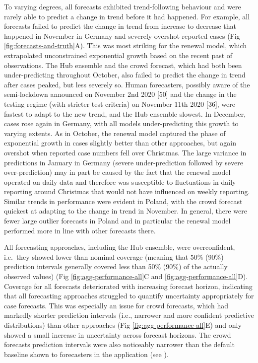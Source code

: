 \documentclass[10pt,letterpaper]{article}
\begin{document}
To varying degrees, all forecasts exhibited trend-following behaviour
and were rarely able to predict a change in trend before it had
happened. For example, all forecasts failed to predict the change in
trend from increase to decrease that happened in November in Germany and
severely overshot reported cases (Fig \ref{fig:forecasts-and-truth}A).
This was most striking for the renewal model, which extrapolated
unconstrained exponential growth based on the recent past of
observations. The Hub ensemble and the crowd forecast, which had both
been under-predicting throughout October, also failed to predict the
change in trend after cases peaked, but less severely so. Human
forecasters, possibly aware of the semi-lockdown announced on November
2nd 2020 {[}50{]} and the change in the testing regime (with stricter
test criteria) on November 11th 2020 {[}36{]}, were fastest to adapt to
the new trend, and the Hub ensemble slowest. In December, cases rose
again in Germany, with all models under-predicting this growth to
varying extents. As in October, the renewal model captured the phase of
exponential growth in cases slightly better than other approaches, but
again overshot when reported case numbers fell over Christmas. The large
variance in predictions in January in Germany (severe under-prediction
followed by severe over-prediction) may in part be caused by the fact
that the renewal model operated on daily data and therefore was
susceptible to fluctuations in daily reporting around Christmas that
would not have influenced on weekly reporting. Similar trends in
performance were evident in Poland, with the crowd forecast quickest at
adapting to the change in trend in November. In general, there were
fewer large outlier forecasts in Poland and in particular the renewal
model performed more in line with other forecasts there.

All forecasting approaches, including the Hub ensemble, were
overconfident, i.e.~they showed lower than nominal coverage (meaning
that 50\% (90\%) prediction intervals generally covered less than 50\%
(90\%) of the actually observed values) (Fig
\ref{fig:agg-performance-all}C and \ref{fig:agg-performance-all}D).
Coverage for all forecasts deteriorated with increasing forecast
horizon, indicating that all forecasting approaches struggled to
quantify uncertainty appropriately for case forecasts. This was
especially an issue for crowd forecasts, which had markedly shorter
prediction intervals (i.e., narrower and more confident predictive
distributions) than other approaches (Fig
\ref{fig:agg-performance-all}E) and only showed a small increase in
uncertainty across forecast horizons. The crowd forecasts prediction
intervals were also noticeably narrower than the default baseline shown
to forecasters in the application (see
).
\end{document}

